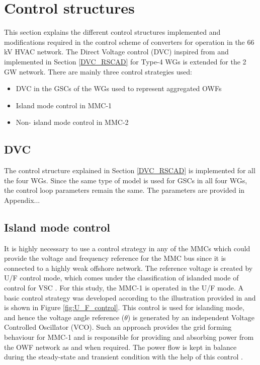 \section{Control structures}\label{control_structures}
This section explains the different control structures implemented and modifications required in the control scheme of converters for operation in the 66 kV \gls{HVAC} network. The Direct Voltage control (\gls{DVC}) inspired from \cite{erlich_new_2017} and implemented in Section \ref{DVC_RSCAD} for Type-4 \gls{WG}s is extended for the 2 GW network. There are mainly three control strategies used:
\begin{itemize}
    \item \gls{DVC} in the \gls{GSC}s of the \gls{WG}s used to represent aggregated \gls{OWF}s 
    \item Island mode control in \gls{MMC}-1
    \item Non- island mode control in \gls{MMC}-2
\end{itemize}

\subsection{DVC}
The control structure explained in Section \ref{DVC_RSCAD} is implemented for all the four \gls{WG}s. Since the same type of model is used for \gls{GSC}s in all four \gls{WG}s, the control loop parameters remain the same. The parameters are provided in Appendix...

\subsection{Island mode control}
It is highly necessary to use a control strategy in any of the \gls{MMC}s which could provide the voltage and frequency reference for the \gls{MMC} bus since it is connected to a highly weak offshore network. The reference voltage is created by U/F control mode, which comes under the classification of islanded mode of control for \gls{VSC} \cite{vrana2013cigre}. For this study, the \gls{MMC}-1 is operated in the U/F mode. A basic control strategy was developed according to the illustration provided in \cite{wachal2014guide} and is shown in Figure \ref{fig:U_F_control}. This control is used for islanding mode, and hence the voltage angle reference ($\theta$) is generated by an independent Voltage Controlled Oscillator (VCO). Such an approach provides the grid forming behaviour for \gls{MMC}-1 and is responsible for providing and absorbing power from the \gls{OWF} network as and when required. The power flow is kept in balance during the steady-state and transient condition with the help of this control \cite{cigre_B455}.  

